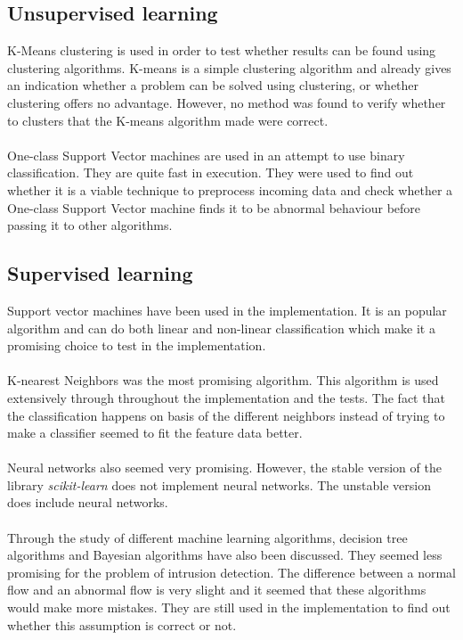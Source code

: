 \subsection{Unsupervised learning}
K-Means clustering is used in order to test whether results can be found using clustering algorithms. K-means is a simple clustering algorithm and already gives an indication whether a problem can be solved using clustering, or whether clustering offers no advantage. However, no method was found to verify whether to clusters that the K-means algorithm made were correct. \\
\\
One-class Support Vector machines are used in an attempt to use binary classification. They are quite fast in execution. They were used to find out whether it is a viable technique to preprocess incoming data and check whether a One-class Support Vector machine finds it to be abnormal behaviour before passing it to other algorithms.

\subsection{Supervised learning}
Support vector machines have been used in the implementation. It is an popular algorithm and can do both linear and non-linear classification which make it a promising choice to test in the implementation. \\
\\
K-nearest Neighbors was the most promising algorithm. This algorithm is used extensively through throughout the implementation and the tests. The fact that the classification happens on basis of the different neighbors instead of trying to make a classifier seemed to fit the feature data better. \\
\\
Neural networks also seemed very promising. However, the stable version of the library \textit{scikit-learn} does not implement neural networks. The unstable version does include neural networks. \\
\\
Through the study of different machine learning algorithms, decision tree algorithms and Bayesian algorithms have also been discussed. They seemed less promising for the problem of intrusion detection. The difference between a normal flow and an abnormal flow is very slight and it seemed that these algorithms would make more mistakes. They are still used in the implementation to find out whether this assumption is correct or not.


